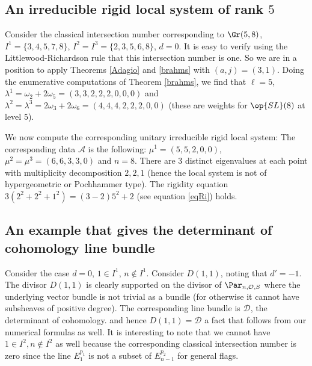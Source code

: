 \subsection{An irreducible rigid local system of rank $5$}\label{E2}
Consider the classical intersection number corresponding to $\Gr(5,8)$, $I^1=\{3,4,5,7,8\}$, $I^2=I^3=\{2,3,5,6,8\}$, $d=0$. It is easy to verify using the Littlewood-Richardson rule that this intersection number is one. So we are in a position to apply Theorems \ref{Adagio} and \ref{brahms} with $(a,j)=(3,1)$. Doing the enumerative computations of
Theorem \ref{brahms}, we find that $\ell=5$, $\lambda^1=\omega_2+2\omega_5 =(3,3,2,2,2,0,0,0)$ and $\lambda^2=\lambda^3=
2\omega_3+2\omega_6 =(4,4,4,2,2,2,0,0) $ (these are weights for $\op{SL}(8)$ at level $5$).

We now compute the corresponding unitary irreducible rigid local system: The corresponding data $\mathcal{A}$ is the following: $\mu^1=(5,5,2,0,0)$,
$\mu^2=\mu^3=(6,6,3,3,0)$ and $n=8$.  There are 3 distinct eigenvalues at each point with multiplicity decomposition $2,2,1$ (hence the local system is not  of hypergeometric or Pochhammer type). The rigidity equation $3(2^2+2^2+1^2)=(3-2)5^2+2$ (see equation \eqref{eqRi}) holds.
\fi
\subsection{An example that gives the determinant of cohomology  line bundle}
Consider  the case $d=0$, $1\in I^1$, $n\not\in I^1$. Consider $D(1,1)$, noting that  $d'=-1$.
The divisor $D(1,1)$ is clearly supported on  the divisor of $\Par_{n,\mathcal{O},S}$ where the underlying vector bundle is not trivial as a bundle (for otherwise it cannot have subsheaves of positive degree).  The corresponding line bundle is $\mathcal{D}$,  the determinant of cohomology. and hence $D(1,1)=\mathcal{D}$ a fact that follows from our numerical formulas as well.
It is interesting to note that we cannot have $1\in I^2, n\not\in I^2$  as well because the corresponding classical intersection number is zero since the line  $E^{p_1}_1$ is not  a subset of  $E^{p_2}_{n-1}$ for general flags.





